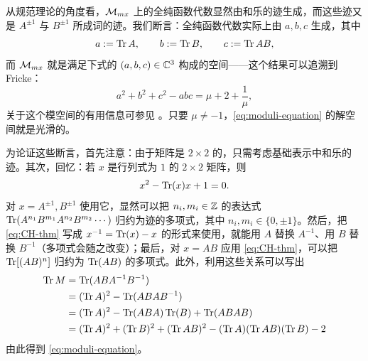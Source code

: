从规范理论的角度看，$\mathcal{M}_{mx}$ 上的全纯函数代数显然由和乐的迹生成，而这些迹又是 $A^{\pm1}$ 与 $B^{\pm1}$ 所成词的迹。我们断言：全纯函数代数实际上由 $a,b,c$ 生成，其中
\begin{equation}
a:= \operatorname{Tr} A, \qquad  b:= \operatorname{Tr} B, \qquad c:= \operatorname{Tr} AB,
\end{equation}
而 $\mathcal{M}_{mx}$ 就是满足下式的 $(a,b,c)\in\mathbb{C}^3$ 构成的空间——这个结果可以追溯到 Fricke：
\begin{equation}\label{eq:moduli-equation}
a^2 + b^2 + c^2 - abc = \mu + 2 + \frac{1}{\mu},
\end{equation}
关于这个模空间的有用信息可参见 \cite{MR2026539,MR1407481}。只要 $\mu\ne -1$，\eqref{eq:moduli-equation} 的解空间就是光滑的。

为论证这些断言，首先注意：由于矩阵是 $2\times2$ 的，只需考虑基础表示中和乐的迹。其次，回忆：若 $x$ 是行列式为 $1$ 的 $2\times2$ 矩阵，则
\begin{equation}\label{eq:CH-thm}
x^2 - \operatorname{Tr}(x) x +1 =0.
\end{equation}
对 $x=A^{\pm 1},B^{\pm 1}$ 使用它，显然可以把 $n_i,m_i\in\mathbb{Z}$ 的表达式 $\operatorname{Tr}(A^{n_1}B^{m_1}A^{n_2}B^{m_2}\cdots)$ 归约为迹的多项式，其中 $n_i,m_i\in\{0,\pm 1\}$。然后，把 \eqref{eq:CH-thm} 写成 $x^{-1}=\operatorname{Tr}(x)-x$ 的形式来使用，就能用 $A$ 替换 $A^{-1}$、用 $B$ 替换 $B^{-1}$（多项式会随之改变）；最后，对 $x=AB$ 应用 \eqref{eq:CH-thm}，可以把 $\operatorname{Tr}[(AB)^n]$ 归约为 $\operatorname{Tr}(AB)$ 的多项式。此外，利用这些关系可以写出
\begin{equation}
\begin{split}
\operatorname{Tr} M & = \operatorname{Tr}(ABA^{-1} B^{-1} ) \\
& = (\operatorname{Tr} A)^2 - \operatorname{Tr}(ABAB^{-1}) \\
& = (\operatorname{Tr} A)^2 - \operatorname{Tr}(ABA) \operatorname{Tr}(B) + \operatorname{Tr}(ABAB)  \\
& = (\operatorname{Tr} A)^2 + (\operatorname{Tr} B)^2 + (\operatorname{Tr} AB)^2 - (\operatorname{Tr} A )(\operatorname{Tr} AB) (\operatorname{Tr} B) - 2
\end{split}
\end{equation}
由此得到 \eqref{eq:moduli-equation}。

